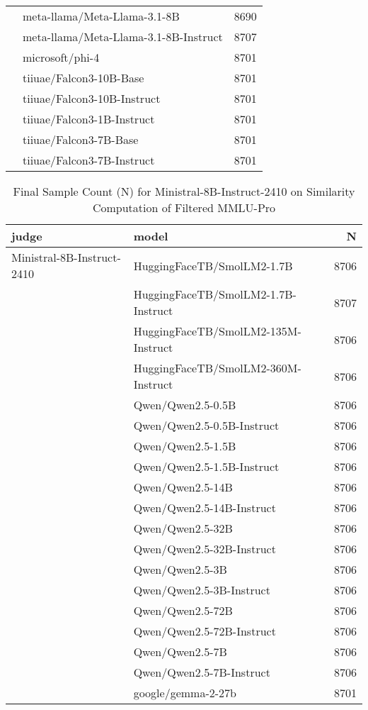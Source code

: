 \begin{table}[]
\begin{tabular}{llr}
 & meta-llama/Meta-Llama-3.1-8B & 8690 \\
 & meta-llama/Meta-Llama-3.1-8B-Instruct & 8707 \\
 & microsoft/phi-4 & 8701 \\
 & tiiuae/Falcon3-10B-Base & 8701 \\
 & tiiuae/Falcon3-10B-Instruct & 8701 \\
 & tiiuae/Falcon3-1B-Instruct & 8701 \\
 & tiiuae/Falcon3-7B-Base & 8701 \\
 & tiiuae/Falcon3-7B-Instruct & 8701 \\
\bottomrule
\end{tabular}
    \label{tab:gemma-2-27b-it}
\end{table}

\begin{table}[]
    \centering
     \caption{Final Sample Count (N) for Ministral-8B-Instruct-2410 on Similarity Computation of Filtered MMLU-Pro}
\begin{tabular}{llr}
\toprule
judge & model & N \\
\midrule
Ministral-8B-Instruct-2410 & HuggingFaceTB/SmolLM2-1.7B & 8706 \\
 & HuggingFaceTB/SmolLM2-1.7B-Instruct & 8707 \\
 & HuggingFaceTB/SmolLM2-135M-Instruct & 8706 \\
 & HuggingFaceTB/SmolLM2-360M-Instruct & 8706 \\
 & Qwen/Qwen2.5-0.5B & 8706 \\
 & Qwen/Qwen2.5-0.5B-Instruct & 8706 \\
 & Qwen/Qwen2.5-1.5B & 8706 \\
 & Qwen/Qwen2.5-1.5B-Instruct & 8706 \\
 & Qwen/Qwen2.5-14B & 8706 \\
 & Qwen/Qwen2.5-14B-Instruct & 8706 \\
 & Qwen/Qwen2.5-32B & 8706 \\
 & Qwen/Qwen2.5-32B-Instruct & 8706 \\
 & Qwen/Qwen2.5-3B & 8706 \\
 & Qwen/Qwen2.5-3B-Instruct & 8706 \\
 & Qwen/Qwen2.5-72B & 8706 \\
 & Qwen/Qwen2.5-72B-Instruct & 8706 \\
 & Qwen/Qwen2.5-7B & 8706 \\
 & Qwen/Qwen2.5-7B-Instruct & 8706 \\
 & google/gemma-2-27b & 8701 \\

\end{tabular}
\end{table}
